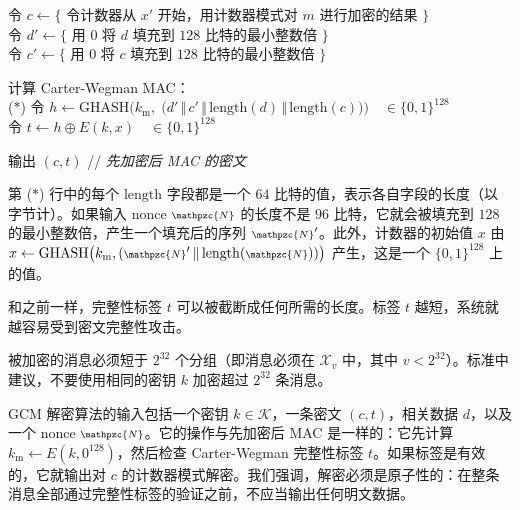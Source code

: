 \hspace*{5pt} 令 $c\leftarrow\{$ 令计数器从 $x'$ 开始，用计数器模式对 $m$ 进行加密的结果 $\}$\\
\hspace*{26pt} 令 $d'\leftarrow\{$ 用 $0$ 将 $d$ 填充到 $128$ 比特的最小整数倍 $\}$\\
\hspace*{26pt} 令 $c'\leftarrow\{$ 用 $0$ 将 $c$ 填充到 $128$ 比特的最小整数倍 $\}$

\vspace*{5pt}

\hspace*{5pt} 计算 Carter-Wegman MAC：\\
\hspace*{5pt} ($*$)
\hspace*{24.5pt} 令 $h\leftarrow\mathrm{GHASH}\Big(k_\mathrm{m},\;\big(d'\,\Vert\,c'\,\Vert\,\mathrm{length}(d)\,\Vert\,\mathrm{length}(c)\big)\Big)\quad\in\{0,1\}^{128}$\\
\hspace*{50pt} 令 $t\leftarrow h\oplus E(k,x)\quad\in\{0,1\}^{128}$

\vspace*{5pt}

\hspace*{5pt} 输出 $(c,t)$
\hspace*{193pt} // \quad \emph{先加密后 MAC 的密文}

\vspace*{10pt}

第 ($*$) 行中的每个 $\mathrm{length}$ 字段都是一个 $64$ 比特的值，表示各自字段的长度（以字节计）。如果输入 nonce ${\scriptstyle\mathpzc{N}}$ 的长度不是 $96$ 比特，它就会被填充到 $128$ 的最小整数倍，产生一个填充后的序列 ${\scriptstyle\mathpzc{N}}'$。此外，计数器的初始值 $x$ 由 $x\leftarrow\mathrm{GHASH}\big(k_\mathrm{m},({\scriptstyle\mathpzc{N}}'\,\Vert\,\mathrm{length}({\scriptstyle\mathpzc{N}}))\big)$ 产生，这是一个 $\{0,1\}^{128}$ 上的值。

和之前一样，完整性标签 $t$ 可以被截断成任何所需的长度。标签 $t$ 越短，系统就越容易受到密文完整性攻击。

被加密的消息必须短于 $2^{32}$ 个分组（即消息必须在 $\mathcal{X}_v$ 中，其中 $v<2^{32}$）。标准中建议，不要使用相同的密钥 $k$ 加密超过 $2^{32}$ 条消息。

GCM 解密算法的输入包括一个密钥 $k\in\mathcal{K}$，一条密文 $(c,t)$，相关数据 $d$，以及一个 nonce ${\scriptstyle\mathpzc{N}}$。它的操作与先加密后 MAC 是一样的：它先计算 $k_\mathrm{m}\leftarrow E(k,0^{128})$，然后检查 Carter-Wegman 完整性标签 $t$。如果标签是有效的，它就输出对 $c$ 的计数器模式解密。我们强调，解密必须是原子性的：在整条消息全部通过完整性标签的验证之前，不应当输出任何明文数据。

